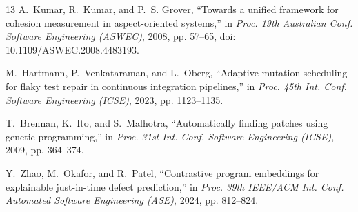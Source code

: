 \documentclass[10pt,conference]{IEEEtran}
\begin{document}
\begin{thebibliography}{13}
A.~Kumar, R.~Kumar, and P.~S. Grover, ``Towards a unified framework for cohesion measurement in
aspect-oriented systems,'' in \emph{Proc. 19th Australian Conf. Software Engineering (ASWEC)}, 2008,
pp. 57--65, doi: 10.1109/ASWEC.2008.4483193.

M.~Hartmann, P.~Venkataraman, and L.~Oberg, ``Adaptive mutation scheduling for flaky test repair in
continuous integration pipelines,'' in \emph{Proc. 45th Int. Conf. Software Engineering (ICSE)}, 2023,
pp. 1123--1135.

T.~Brennan, K.~Ito, and S.~Malhotra, ``Automatically finding patches using genetic programming,'' in
\emph{Proc. 31st Int. Conf. Software Engineering (ICSE)}, 2009, pp. 364--374.

Y.~Zhao, M.~Okafor, and R.~Patel, ``Contrastive program embeddings for explainable just-in-time defect
prediction,'' in \emph{Proc. 39th IEEE/ACM Int. Conf. Automated Software Engineering (ASE)}, 2024,
pp. 812--824.

\end{thebibliography}
\end{document}
